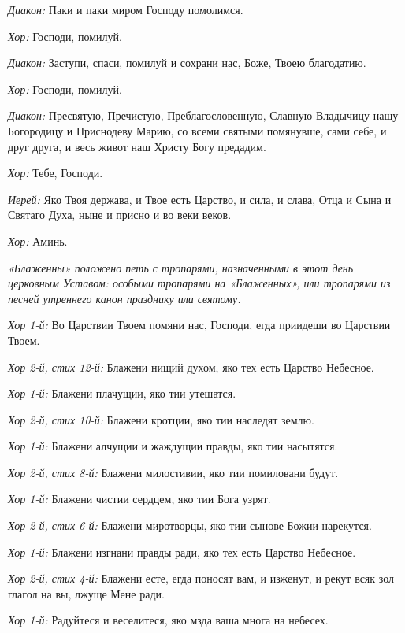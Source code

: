 \begin{mymulticols}

{\itshape Диакон:} Паки и паки миром Господу помолимся. 

{\itshape Хор:} Господи, помилуй. 

{\itshape Диакон:} Заступи, спаси, помилуй и сохрани нас, Боже, Твоею благодатию. 

{\itshape Хор:} Господи, помилуй. 

{\itshape Диакон:} Пресвятую, Пречистую, Преблагословенную, Славную Владычицу нашу Богородицу и Приснодеву Марию, со всеми святыми помянувше, сами себе, и друг друга, и весь живот наш Христу Богу предадим.

{\itshape Хор:} Тебе, Господи. 

{\itshape Иерей:} Яко Твоя держава, и Твое есть Царство, и сила, и слава, Отца и Сына и Святаго Духа, ныне и присно и во веки веков. 

{\itshape Хор:} Аминь.


{\itshape «Блаженны» положено петь с тропарями, назначенными в этот день церковным Уставом: особыми тропарями на «Блаженных», или тропарями из песней утреннего канон празднику или святому.}

{\itshape Хор 1-й:} Во Царствии Твоем помяни нас, Господи, егда приидеши во Царствии Твоем. 

{\itshape Хор 2-й, стих 12-й:} Блажени нищий духом, яко тех есть Царство Небесное. 

{\itshape Хор 1-й:} Блажени плачущии, яко тии утешатся.

{\itshape Хор 2-й, стих 10-й:} Блажени кротции, яко тии наследят землю. 

{\itshape Хор 1-й:} Блажени алчущии и жаждущии правды, яко тии насытятся.

{\itshape Хор 2-й, стих 8-й:} Блажени милостивии, яко тии помиловани будут. 

{\itshape Хор 1-й:} Блажени чистии сердцем, яко тии Бога узрят.

{\itshape Хор 2-й, стих 6-й:} Блажени миротворцы, яко тии сынове Божии нарекутся. 

{\itshape Хор 1-й:} Блажени изгнани правды ради, яко тех есть Царство Небесное.

{\itshape Хор 2-й, стих 4-й:} Блажени есте, егда поносят вам, и изженут, и рекут всяк зол глагол на вы, лжуще Мене ради. 

{\itshape Хор 1-й:} Радуйтеся и веселитеся, яко мзда ваша многа на небесех. 


\end{mymulticols}
